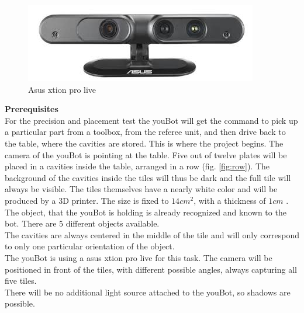 \documentclass{article}
\begin{document}
\begin{figure}[h!]
\centering
\includegraphics[scale=0.5]{images/camera.jpeg}
\caption{Asus xtion pro live}
\label{fig:camera}
\end{figure}


\newpage


\textbf{Prerequisites}\\

For the precision and placement test the youBot will get the command to pick up a particular part from a toolbox, from the referee unit, and then drive back to the table, where the cavities are stored. This is where the project begins. The camera of the youBot is pointing at the table. Five out of twelve plates will be placed in a cavities inside the table, arranged in a row (fig. \ref{fig:row}). The background of the cavities inside the tiles will thus be dark and the full tile will always be visible. The tiles themselves have a nearly white color and will be produced by a 3D printer. The size is fixed to $14cm^2$, with a thickness of  $1cm$ .\\
The object, that the youBot is holding is already recognized and known to the bot. There are 5 different objects available.\\
The cavities are always centered in the middle of the tile and will only correspond to only one particular orientation of the object.\\
The youBot is using a asus xtion pro live for this task. The camera will be positioned in front of the tiles, with different possible angles, always capturing all five tiles. \\
There will be no additional light source attached to the youBot, so shadows are possible.\\
\end{document}

